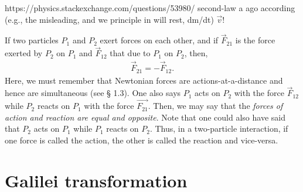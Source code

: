 https://physics.stackexchange.com/questions/53980/
second-law
% 
% 
a 
ago 
according 
(e.g., 
the 
misleading, 
% 
% 
and we 
principle 
in 
will 
rest, 
dm/dt)  
$\vec{v} !$

 If two particles $P_1$ and $P_2$ exert
forces on each other, and if $\vec{F}_{21}$ is the 
force
exerted by $P_2$ on $P_1$ and $\vec{F}_{12}$ that due 
to
$P_1$ on $P_2$, then,
\begin{align}\label{gr.5}
\vec{F}_{21} = -\vec{F}_{12}.
\end{align}
Here, we must remember that Newtonian forces are 
actions-at-a-distance and hence are simultaneous (see 
\S 
1.3). One also says $P_1$ {acts on} $P_2$ with the 
force 
$\vec{F}_{12} $ while $P_2$ {reacts on} $P_1$ with the 
force 
$\vec{ F_{21}}$. Then, we may say that the 
\textsl{forces of 
action and reaction are equal and opposite}. Note that 
one 
could also have said that $P_2$ {acts on} $P_1$ while 
$P_1$ 
{reacts on} $P_2$. Thus, in a two-particle interaction, 
if 
one force is called the action, the other is called 
the 
reaction and vice-versa.

\section{Galilei transformation}

